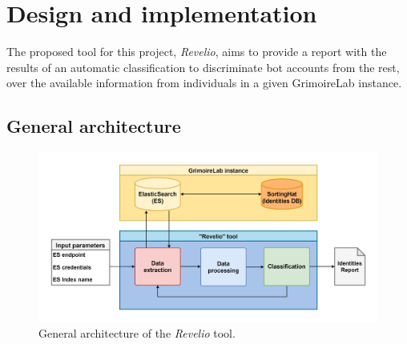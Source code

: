 \documentclass[a4paper, 12pt]{book}
\begin{document}




\cleardoublepage


\chapter{Design and implementation}
\label{chap:design-implementation}

The proposed tool for this project, \emph{Revelio}, aims to provide a report with the results of an automatic classification to discriminate bot accounts from the rest, over the available information from individuals in a given GrimoireLab instance.


\section{General architecture} 
\label{sec:architecture}

\begin{figure}
  \centering
  \includegraphics[width=17cm, keepaspectratio]{img/general-architecture-revelio.png}
  \caption{General architecture of the \emph{Revelio} tool.}
  \label{fig:general-arch-revelio}
\end{figure}
\end{document}
